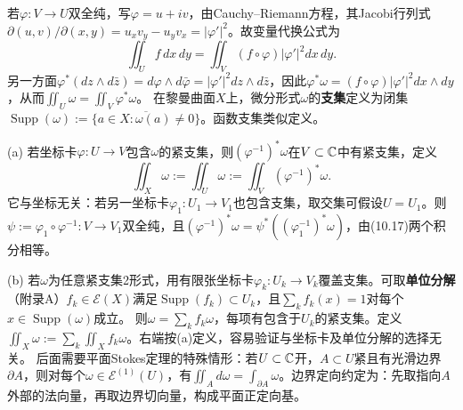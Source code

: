若$\varphi:V\to U$双全纯，写$\varphi=u+iv$，由Cauchy--Riemann方程，其Jacobi行列式$\partial(u,v)/\partial(x,y)=u_xv_y-u_yv_x=|\varphi'|^2$。故变量代换公式为
\[
\iint_Uf\,dx\,dy=\iint_V(f\circ\varphi)|\varphi'|^2dx\,dy.
\]
另一方面$\varphi^*(dz\wedge d\bar z)=d\varphi\wedge d\bar\varphi=|\varphi'|^2dz\wedge d\bar z$，因此$\varphi^*\omega=(f\circ\varphi)|\varphi'|^2dx\wedge dy$，从而$\iint_U\omega=\iint_V\varphi^*\omega$。
在黎曼曲面$X$上，微分形式$\omega$的\textbf{支集}定义为闭集$\operatorname{Supp}(\omega):=\overline{\{a\in X:\omega(a)\ne0\}}$。函数支集类似定义。

(a) 若坐标卡$\varphi:U\to V$包含$\omega$的紧支集，则$(\varphi^{-1})^*\omega$在$V\subset\mathbb C$中有紧支集，定义
\[
\iint_X\omega:=\iint_U\omega:=\iint_V(\varphi^{-1})^*\omega.
\]
它与坐标无关：若另一坐标卡$\varphi_1:U_1\to V_1$也包含支集，取交集可假设$U=U_1$。则$\psi:=\varphi_1\circ\varphi^{-1}:V\to V_1$双全纯，且$(\varphi^{-1})^*\omega=\psi^*((\varphi_1^{-1})^*\omega)$，由(10.17)两个积分相等。

(b) 若$\omega$为任意紧支集2形式，用有限张坐标卡$\varphi_k:U_k\to V_k$覆盖支集。可取\textbf{单位分解}（附录A）$f_k\in\mathcal E(X)$满足$\operatorname{Supp}(f_k)\subset U_k$，且$\sum_kf_k(x)=1$对每个$x\in\operatorname{Supp}(\omega)$成立。
则$\omega=\sum_kf_k\omega$，每项有包含于$U_k$的紧支集。定义$\iint_X\omega:=\sum_k\iint_Xf_k\omega$。右端按(a)定义，容易验证与坐标卡及单位分解的选择无关。
后面需要平面Stokes定理的特殊情形：若$U\subset\mathbb C$开，$A\subset U$紧且有光滑边界$\partial A$，则对每个$\omega\in\mathcal E^{(1)}(U)$，有$\iint_A d\omega=\int_{\partial A}\omega$。边界定向约定为：先取指向$A$外部的法向量，再取边界切向量，构成平面正定向基。

